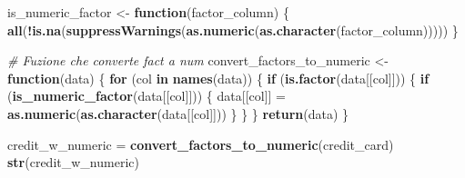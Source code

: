 \documentclass[
]{article}
\newenvironment{Shaded}{\begin{snugshade}}{\end{snugshade}}
\newcommand{\CommentTok}[1]{\textcolor[rgb]{0.56,0.35,0.01}{\textit{#1}}}
\newcommand{\ControlFlowTok}[1]{\textcolor[rgb]{0.13,0.29,0.53}{\textbf{#1}}}
\newcommand{\FunctionTok}[1]{\textcolor[rgb]{0.13,0.29,0.53}{\textbf{#1}}}
\newcommand{\NormalTok}[1]{#1}
\newcommand{\OtherTok}[1]{\textcolor[rgb]{0.56,0.35,0.01}{#1}}
\newcommand{\SpecialCharTok}[1]{\textcolor[rgb]{0.81,0.36,0.00}{\textbf{#1}}}
\begin{document}
\begin{Shaded}
\begin{Highlighting}[]
\NormalTok{is\_numeric\_factor }\OtherTok{\textless{}{-}} \ControlFlowTok{function}\NormalTok{(factor\_column) \{}
  \FunctionTok{all}\NormalTok{(}\SpecialCharTok{!}\FunctionTok{is.na}\NormalTok{(}\FunctionTok{suppressWarnings}\NormalTok{(}\FunctionTok{as.numeric}\NormalTok{(}\FunctionTok{as.character}\NormalTok{(factor\_column)))))}
\NormalTok{\}}

\CommentTok{\# Fuzione che converte fact a num}
\NormalTok{convert\_factors\_to\_numeric }\OtherTok{\textless{}{-}} \ControlFlowTok{function}\NormalTok{(data) \{}
  \ControlFlowTok{for}\NormalTok{ (col }\ControlFlowTok{in} \FunctionTok{names}\NormalTok{(data)) \{}
    \ControlFlowTok{if}\NormalTok{ (}\FunctionTok{is.factor}\NormalTok{(data[[col]])) \{}
      \ControlFlowTok{if}\NormalTok{ (}\FunctionTok{is\_numeric\_factor}\NormalTok{(data[[col]])) \{}
\NormalTok{        data[[col]] }\OtherTok{=} \FunctionTok{as.numeric}\NormalTok{(}\FunctionTok{as.character}\NormalTok{(data[[col]]))}
\NormalTok{      \}}
\NormalTok{    \}}
\NormalTok{  \}}
  \FunctionTok{return}\NormalTok{(data)}
\NormalTok{\}}

\NormalTok{credit\_w\_numeric }\OtherTok{=} \FunctionTok{convert\_factors\_to\_numeric}\NormalTok{(credit\_card)}
\FunctionTok{str}\NormalTok{(credit\_w\_numeric)}
\end{Highlighting}
\end{Shaded}
\end{document}

